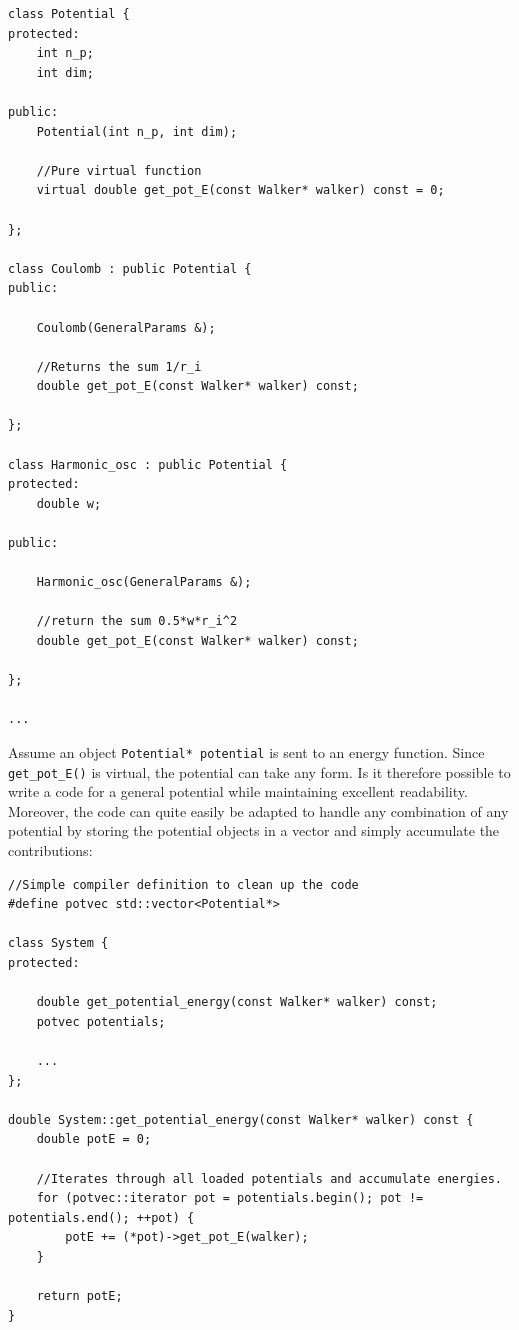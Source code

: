 \clearpage
\vspace{0.5 cm}
\begin{lstlisting}
class Potential {
protected:
    int n_p;
    int dim;

public:
    Potential(int n_p, int dim);

    //Pure virtual function
    virtual double get_pot_E(const Walker* walker) const = 0;

};

class Coulomb : public Potential {
public:

    Coulomb(GeneralParams &);

    //Returns the sum 1/r_i
    double get_pot_E(const Walker* walker) const;

};

class Harmonic_osc : public Potential {
protected:
    double w;

public:

    Harmonic_osc(GeneralParams &);

    //return the sum 0.5*w*r_i^2
    double get_pot_E(const Walker* walker) const;

};

...

\end{lstlisting}

Assume an object \verb+Potential* potential+ is sent to an energy function. Since \verb+get_pot_E()+ is virtual, the potential can take any form. Is it therefore possible to write a code for a general potential while maintaining excellent readability. Moreover, the code can quite easily be adapted to handle any combination of any potential by storing the potential objects in a vector and simply accumulate the contributions:

\vspace{0.5cm}
\begin{lstlisting}
//Simple compiler definition to clean up the code
#define potvec std::vector<Potential*>

class System {
protected:

    double get_potential_energy(const Walker* walker) const;
    potvec potentials;
    
    ...
};

double System::get_potential_energy(const Walker* walker) const {
    double potE = 0;

    //Iterates through all loaded potentials and accumulate energies.
    for (potvec::iterator pot = potentials.begin(); pot != potentials.end(); ++pot) {
        potE += (*pot)->get_pot_E(walker);
    }

    return potE;
}
\end{lstlisting}

